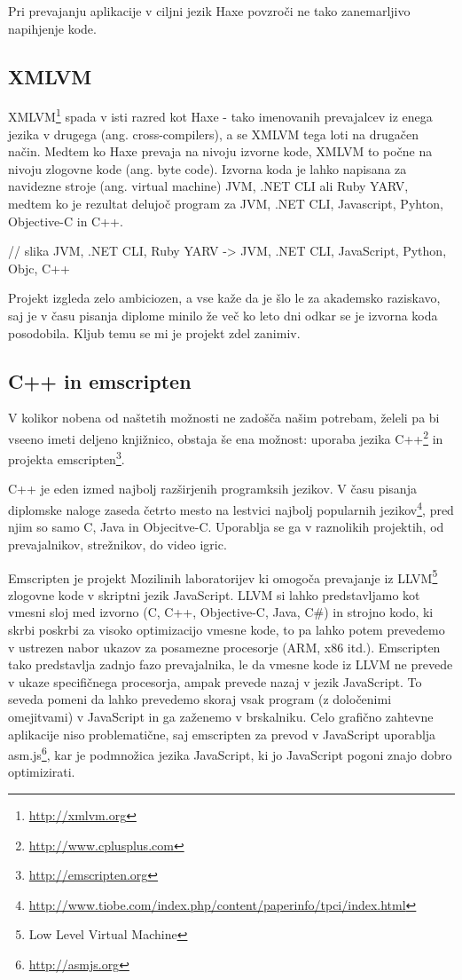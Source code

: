 Pri prevajanju aplikacije v ciljni jezik Haxe povzroči ne tako zanemarljivo napihjenje kode.

\subsection{XMLVM}

XMLVM\footnote{\href{http://xmlvm.org}{http://xmlvm.org}} spada v isti razred kot Haxe - tako imenovanih prevajalcev iz enega jezika v drugega (ang. cross-compilers), a se XMLVM tega loti na drugačen način. Medtem ko Haxe prevaja na nivoju izvorne kode, XMLVM to počne na nivoju zlogovne kode (ang. byte code). Izvorna koda je lahko napisana za navidezne stroje (ang. virtual machine) JVM, .NET CLI ali Ruby YARV, medtem ko je rezultat delujoč program za JVM, .NET CLI, Javascript, Pyhton, Objective-C in C++.

// slika JVM, .NET CLI, Ruby YARV -> JVM, .NET CLI, JavaScript, Python, Objc, C++

Projekt izgleda zelo ambiciozen, a vse kaže da je šlo le za akademsko raziskavo, saj je v času pisanja diplome minilo že več ko leto dni odkar se je izvorna koda posodobila. Kljub temu se mi je projekt zdel zanimiv.

\subsection{C++ in emscripten}

V kolikor nobena od naštetih možnosti ne zadošča našim potrebam, želeli pa bi vseeno imeti deljeno knjižnico, obstaja še ena možnost: uporaba jezika C++\footnote{\href{http://www.cplusplus.com}{http://www.cplusplus.com}} in projekta emscripten\footnote{\href{http://emscripten.org}{http://emscripten.org}}.

C++ je eden izmed najbolj razširjenih programksih jezikov. V času pisanja diplomske naloge zaseda četrto mesto na lestvici najbolj popularnih jezikov\footnote{\href{http://www.tiobe.com/index.php/content/paperinfo/tpci/index.html}{http://www.tiobe.com/index.php/content/paperinfo/tpci/index.html}}, pred njim so samo C, Java in Objecitve-C. Uporablja se ga v raznolikih projektih, od prevajalnikov, strežnikov, do video igric.

Emscripten je projekt Mozilinih laboratorijev ki omogoča prevajanje iz LLVM\footnote{Low Level Virtual Machine} zlogovne kode v skriptni jezik JavaScript. LLVM si lahko predstavljamo kot vmesni sloj med izvorno (C, C++, Objective-C, Java, C#) in strojno kodo, ki skrbi poskrbi za visoko optimizacijo vmesne kode, to pa lahko potem prevedemo v ustrezen nabor ukazov za posamezne procesorje (ARM, x86 itd.). Emscripten tako predstavlja zadnjo fazo prevajalnika, le da vmesne kode iz LLVM ne prevede v ukaze specifičnega procesorja, ampak prevede nazaj v jezik JavaScript. To seveda pomeni da lahko prevedemo skoraj vsak program (z določenimi omejitvami) v JavaScript in ga zaženemo v brskalniku. Celo grafično zahtevne aplikacije niso problematične, saj emscripten za prevod v JavaScript uporablja asm.js\footnote{\href{http://asmjs.org}{http://asmjs.org}}, kar je podmnožica jezika JavaScript, ki jo JavaScript pogoni znajo dobro optimizirati.

